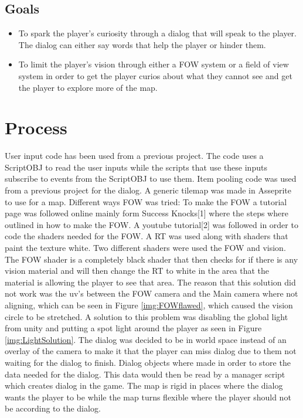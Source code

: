 \documentclass{article}
\begin{document}
\subsection{Goals}
\begin{itemize}
    \item To spark the player's curiosity through a \gls{dialog} that will speak to the
    player. The \gls{dialog} can either say words that help the player or hinder them.
    \item To limit the player's vision through either a \gls{FOW} system or a field of view system
    in order to get the player curios about what they cannot see and get the player to explore
    more of the \gls{map}. 
\end{itemize}




\newpage
\section{Process}
User input code has been used from a previous project. The code uses a \gls{ScriptOBJ}
to read the user inputs while the scripts that use these inputs subscribe to events from
the \gls{ScriptOBJ} to use them.
Item pooling code was used from a previous project for the dialog.
A generic tilemap was made in Asseprite to use for a \gls{map}.
\newline
Different ways \gls{FOW} was tried:
\newline
To make the \gls{FOW} a tutorial page was followed online mainly form Success Knocks[1]
where the steps where outlined in how to make the \gls{FOW}. A youtube tutorial[2] was
followed in order to code the shaders needed for the \gls{FOW}.
\newline
A \gls{RT} was used along with shaders 
that paint the texture white. Two different shaders were used the \gls{FOW}
and vision. The \gls{FOW} shader is a completely black shader that then checks for
if there is any vision material and will then change the \gls{RT} to white in
the area that the material is allowing the player to see that area. The reason that
this solution did not work was the uv's between the \gls{FOW} camera and the Main camera
where not aligning, which can be seen in Figure \ref{img:FOWflawed}, which caused the vision 
circle to be stretched.
\newline
A solution to this problem was disabling the global light from unity and putting a 
spot light around the player as seen in Figure \ref{img:LightSolution}.
\newline
The \gls{dialog} was decided to be in world space instead of an overlay of the 
camera to make it that the player can miss dialog due to them not waiting for the
dialog to finish. Dialog objects where made in order to store the data needed for the \gls{dialog}.
This data would then be read by a manager script which creates dialog in the
game. 
\newline
The \gls{map} is rigid in places where the \gls{dialog} wants the player to be while 
the \gls{map} turns flexible where the player should not be according to the \gls{dialog}.
\end{document}
